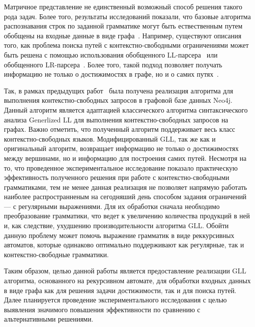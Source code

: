 Матричное представление не единственный возможный способ решения такого рода задач. Более того, результаты исследований показали, что базовые алгоритма распознавания строк по заданной грамматике могут быть ествественным путем обобщены на входные данные в виде графа~\cite{10.1145/3166094.3166104}. Например, существуют описания того, как проблема поиска путей с контекстно-свободными ограничениями может быть решена с помощью использования обобщенного LL-парсера~\cite{GLL1, GLL2} или обобщенного LR-парсера~\cite{LR, GLR}. Более того, такой подход позволяет получать информацию не только о достижимостях в графе, но и о самих путях~\cite{10.1007/978-3-030-61133-0_7}.

Так, в рамках предыдущих работ~\cite{VVP} была получена реализация алгоритма для выполнения контекстно-свободных запросов в графовой базе данных Neo4j. Данный алгоритм является адаптацией классического алгоритма синтаксического анализа Generlized LL для выполнения контекстно-свободных запросов на графах. Важно отметить, что полученный алгоритм поддерживает весь класс контекстно-свободных языков. Модифицированный GLL, так же как и оригинальный алгоритм, возвращает информацию не только о достижимостях между вершинами, но и информацию для построения самих путей. Несмотря на то, что проведенное экспериментальное исследование показало практическую эффективность полученного решения при работе с контекстно-свободными грамматиками, тем не менее данная реализация не позволяет напрямую работать наиболее распространненым на сегодняший день способом задания ограничений --- с регулярными выражениями. Для их обработки сначала необходимо преобразование грамматики, что ведет к увеличению количества продукций в ней и, как следствие, ухудшению производительности алгоритма GLL. Обойти данную проблему может помочь выражение грамматик в виде реккурсивных автоматов, которые одинаково оптимально поддерживают как регулярные, так и контекстно-свободные грамматики.

Таким образом, целью данной работы является предоставление реализации GLL алгоритма, основанного на рекурсивном автомате, для обработки входных данных в виде графа как для решения задачи достижимости, так и для поиска путей. Далее планируется  проведение экспериментального исследования с целью выявления значимого повышения эффективности по сравнению с альтернативными решениями.
